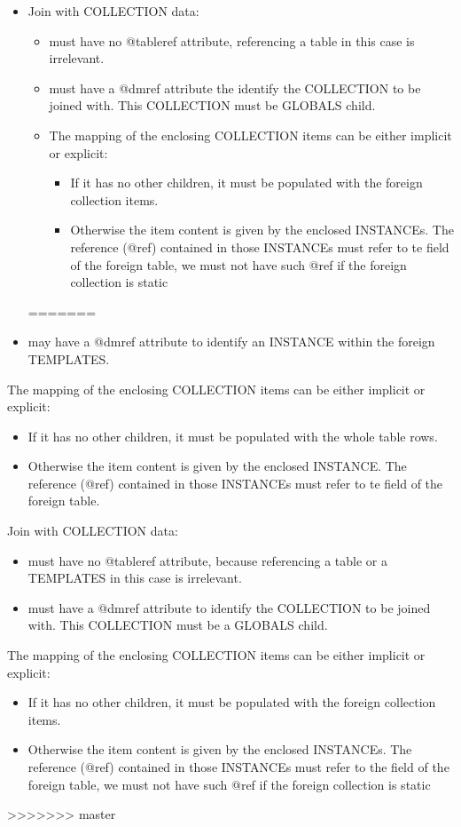 \begin{itemize}
       
  \item Join with COLLECTION data:
       \begin{itemize}
         \item must have no @tableref attribute, referencing a table in this case is irrelevant.
         \item must have a @dmref attribute the identify the COLLECTION to be joined with. This COLLECTION must be GLOBALS child.
         \item The mapping of the enclosing COLLECTION items can be either implicit or explicit:
         \begin{itemize}
             \item If it has no other children, it must be populated with the foreign collection items.
             \item Otherwise the item content is given by the enclosed INSTANCEs. The reference (@ref) contained 
                      in those INSTANCEs must refer to te field of the foreign table, we must not have such @ref if the foreign 
                      collection is static
       \end{itemize}
  \end{itemize}
=======
         \item may have a @dmref attribute to identify an INSTANCE within the foreign TEMPLATES.
       \end{itemize}
       The mapping of the enclosing COLLECTION items can be either implicit or explicit:
       \begin{itemize}
         \item If it has no other children, it must be populated with the whole table rows.
         \item Otherwise the item content is given by the enclosed INSTANCE. 
                 The reference (@ref) contained in those INSTANCEs must refer to te field of the foreign table.
       \end{itemize}
       
  \item Join with COLLECTION data:
       \begin{itemize}
         \item must have no @tableref attribute, because referencing a table or a TEMPLATES in this case is irrelevant.
         \item must have a @dmref attribute to identify the COLLECTION to be joined with. This COLLECTION must be a GLOBALS child.
       \end{itemize}
       The mapping of the enclosing COLLECTION items can be either implicit or explicit:
       \begin{itemize}
         \item If it has no other children, it must be populated with the foreign collection items.
         \item Otherwise the item content is given by the enclosed INSTANCEs. The reference (@ref) contained in those INSTANCEs must refer to the field of the foreign table, we must not have such @ref if the foreign collection is static
       \end{itemize}
>>>>>>> master
           
